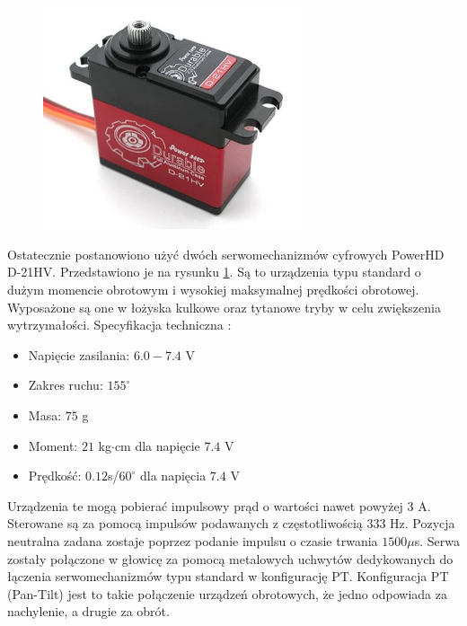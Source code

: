 \paragraph*{}

\begin{figure}[h]
	\centering
	\includegraphics[width=3in]{Pololu.jpg}
	\label{fig:pololu}
\end{figure}

Ostatecznie postanowiono użyć dwóch serwomechanizmów cyfrowych PowerHD D-21HV.
Przedstawiono je na rysunku \ref{fig:pololu}.
Są to urządzenia typu standard o dużym momencie obrotowym i wysokiej maksymalnej prędkości obrotowej. 
Wyposażone są one w łożyska kulkowe oraz tytanowe tryby w celu zwiększenia  wytrzymałości. 
Specyfikacja techniczna \cite{Pololu}:
\begin{itemize}
\item Napięcie zasilania: \(6.0-7.4\) V
\item Zakres ruchu: \(155^\circ\)
\item Masa: \(75\) g
\item Moment: \(21\) kg\(\cdot\)cm dla napięcie \(7.4\) V
\item Prędkość: \(0.12\)s/\(60^\circ\) dla napięcia \(7.4\) V
\end{itemize}
Urządzenia te mogą pobierać impulsowy prąd o wartości nawet powyżej 3 A.
Sterowane są za pomocą impulsów podawanych z częstotliwością 333 Hz.
Pozycja neutralna zadana zostaje poprzez podanie impulsu o czasie trwania \(1500 \mu\)s. %
Serwa zostały połączone w głowicę za pomocą metalowych uchwytów dedykowanych do łączenia serwomechanizmów typu standard w konfigurację PT.
Konfiguracja PT (Pan-Tilt) jest to takie połączenie urządzeń obrotowych, że jedno odpowiada za nachylenie, a drugie za obrót.

